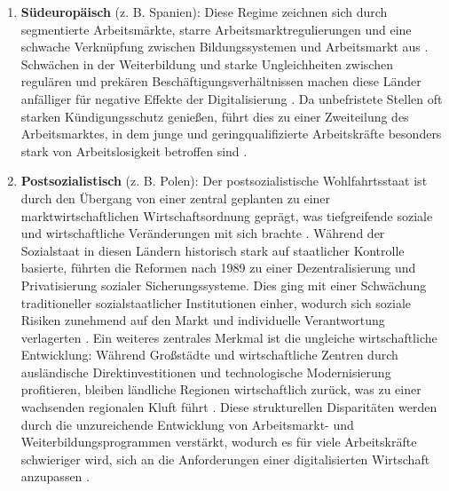 \begin{enumerate}

    \item \textbf{Südeuropäisch} (z. B. Spanien): Diese Regime zeichnen sich durch 
    segmentierte Arbeitsmärkte, starre Arbeitsmarktregulierungen und eine schwache 
    Verknüpfung zwischen Bildungssystemen und Arbeitsmarkt aus 
    \parencite[S. 19]{ferrera1996thesouthern}. Schwächen in der Weiterbildung 
    und starke Ungleichheiten zwischen regulären und prekären Beschäftigungsverhältnissen 
    machen diese Länder anfälliger für negative Effekte der Digitalisierung 
    \parencite[S. 19–20]{ferrera1996thesouthern}. Da unbefristete Stellen oft starken 
    Kündigungsschutz genießen, führt dies zu einer Zweiteilung des Arbeitsmarktes, in dem 
    junge und geringqualifizierte Arbeitskräfte besonders stark von Arbeitslosigkeit 
    betroffen sind \parencite[S. 19–21]{ferrera1996thesouthern}.
    
    \item \textbf{Postsozialistisch} (z. B. Polen): Der postsozialistische Wohlfahrtsstaat 
    ist durch den Übergang von einer zentral geplanten zu einer marktwirtschaftlichen 
    Wirtschaftsordnung geprägt, was tiefgreifende soziale und wirtschaftliche Veränderungen 
    mit sich brachte \parencite[S. 104]{cerami2006socialpolicy}. Während der 
    Sozialstaat in diesen Ländern historisch stark auf staatlicher Kontrolle basierte, 
    führten die Reformen nach 1989 zu einer Dezentralisierung und Privatisierung sozialer 
    Sicherungssysteme. Dies ging mit einer Schwächung traditioneller sozialstaatlicher 
    Institutionen einher, wodurch sich soziale Risiken zunehmend auf den Markt und 
    individuelle Verantwortung verlagerten 
    \parencite[vgl.][S. 104–105]{cerami2006socialpolicy}. Ein weiteres zentrales Merkmal 
    ist die ungleiche wirtschaftliche Entwicklung: Während Großstädte und wirtschaftliche 
    Zentren durch ausländische Direktinvestitionen und technologische Modernisierung 
    profitieren, bleiben ländliche Regionen wirtschaftlich zurück, was zu einer wachsenden 
    regionalen Kluft führt \parencite[vgl.][S. 169]{cerami2006socialpolicy}. Diese 
    strukturellen Disparitäten werden durch die unzureichende Entwicklung von 
    Arbeitsmarkt- und Weiterbildungsprogrammen verstärkt, wodurch es für viele Arbeitskräfte 
    schwieriger wird, sich an die Anforderungen einer digitalisierten Wirtschaft anzupassen 
    \parencite[vgl.][S. 105]{cerami2006socialpolicy}.
    
\end{enumerate}

